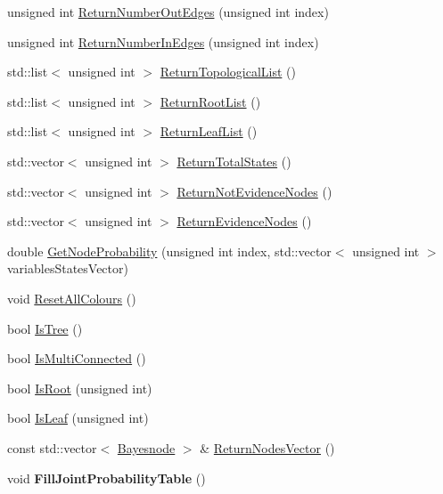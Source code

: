\begin{DoxyCompactItemize}
\item 
unsigned int \hyperlink{classbayonet_1_1_bayesnet_aae9de07f181dc75f309b7f59e302a947}{Return\-Number\-Out\-Edges} (unsigned int index)
\item 
unsigned int \hyperlink{classbayonet_1_1_bayesnet_a7d47ce38f3882b80121f6acc351fd373}{Return\-Number\-In\-Edges} (unsigned int index)
\item 
std\-::list$<$ unsigned int $>$ \hyperlink{classbayonet_1_1_bayesnet_a3e8e924c33186e72bfa7d8ace1c211e6}{Return\-Topological\-List} ()
\item 
std\-::list$<$ unsigned int $>$ \hyperlink{classbayonet_1_1_bayesnet_a0043ca31c5eb4fe742557bf92cc943a5}{Return\-Root\-List} ()
\item 
std\-::list$<$ unsigned int $>$ \hyperlink{classbayonet_1_1_bayesnet_ac30c1485ff84825f534bf7604ee0115d}{Return\-Leaf\-List} ()
\item 
std\-::vector$<$ unsigned int $>$ \hyperlink{classbayonet_1_1_bayesnet_af05513604bc2273f64abd7e685d1d636}{Return\-Total\-States} ()
\item 
std\-::vector$<$ unsigned int $>$ \hyperlink{classbayonet_1_1_bayesnet_ac9f389cd6382946deb5b04cb6513f11e}{Return\-Not\-Evidence\-Nodes} ()
\item 
std\-::vector$<$ unsigned int $>$ \hyperlink{classbayonet_1_1_bayesnet_a8610f2ec52297edfe6bf2151d2ce002c}{Return\-Evidence\-Nodes} ()
\item 
double \hyperlink{classbayonet_1_1_bayesnet_a0140ea4f620f852b12746f2a92bd4013}{Get\-Node\-Probability} (unsigned int index, std\-::vector$<$ unsigned int $>$ variables\-States\-Vector)
\item 
void \hyperlink{classbayonet_1_1_bayesnet_a2a934ac59da3a02720c40515b6b599e7}{Reset\-All\-Colours} ()
\item 
bool \hyperlink{classbayonet_1_1_bayesnet_aaceeb50586b7c5c5920e276671d8f30e}{Is\-Tree} ()
\item 
bool \hyperlink{classbayonet_1_1_bayesnet_af82ed68cc718009c948d681addd48e23}{Is\-Multi\-Connected} ()
\item 
bool \hyperlink{classbayonet_1_1_bayesnet_a5877478cf225ed47f43df29cc087c5d6}{Is\-Root} (unsigned int)
\item 
bool \hyperlink{classbayonet_1_1_bayesnet_af9809dc12e3f77859f9674ced08fe7b0}{Is\-Leaf} (unsigned int)
\item 
const std\-::vector$<$ \hyperlink{classbayonet_1_1_bayesnode}{Bayesnode} $>$ \& \hyperlink{classbayonet_1_1_bayesnet_a7b349d82edb61c0c982bb4b1240912da}{Return\-Nodes\-Vector} ()
\item 
\hypertarget{classbayonet_1_1_bayesnet_a586e4951a91ac2c47d8448caea25d657}{void {\bfseries Fill\-Joint\-Probability\-Table} ()}\label{classbayonet_1_1_bayesnet_a586e4951a91ac2c47d8448caea25d657}


\end{DoxyCompactItemize}
